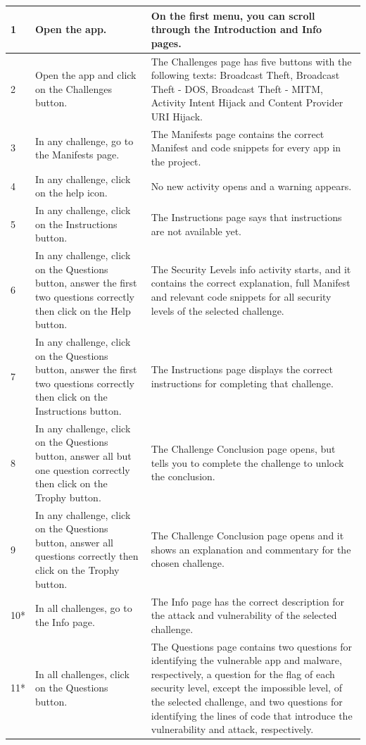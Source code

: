 \begin{center}
\begin{longtable}{|p{0.4cm} |p{5.2cm} |p{7.4cm} |}
         \hline
         1 & Open the app. & On the first menu, you can scroll through the Introduction and Info pages. \\
         \hline
         2 & Open the app and click on the Challenges button. & The Challenges page has five buttons with the following texts: Broadcast Theft, Broadcast Theft - DOS, Broadcast Theft - MITM, Activity Intent Hijack and Content Provider URI Hijack. \\
         \hline
         3 & In any challenge, go to the Manifests page. & The Manifests page contains the correct Manifest and code snippets for every app in the project. \\
         \hline
         4 & In any challenge, click on the help icon. & No new activity opens and a warning appears. \\
         \hline
         5 & In any challenge, click on the Instructions button. & The Instructions page says that instructions are not available yet.\\
         \hline
         6 & In any challenge, click on the Questions button, answer the first two questions correctly then click on the Help button. & The Security Levels info activity starts, and it contains the correct explanation, full Manifest and relevant code snippets for all security levels of the selected challenge.\\
         \hline
         7 & In any challenge, click on the Questions button, answer the first two questions correctly then click on the Instructions button. & The Instructions page displays the correct instructions for completing that challenge.\\
         \hline
         8 & In any challenge, click on the Questions button, answer all but one question correctly then click on the Trophy button. & The Challenge Conclusion page opens, but tells you to complete the challenge to unlock the conclusion.\\
         \hline
         9 & In any challenge, click on the Questions button, answer all questions correctly then click on the Trophy button. & The Challenge Conclusion page opens and it shows an explanation and commentary for the chosen challenge.\\
         \hline
         10* & In all challenges, go to the Info page. & The Info page has the correct description for the attack and vulnerability of the selected challenge. \\
         \hline
         11* & In all challenges, click on the Questions button. & The Questions page contains two questions for identifying the vulnerable app and malware, respectively, a question for the flag of each security level, except the impossible level, of the selected challenge, and two questions for identifying the lines of code that introduce the vulnerability and attack, respectively. \\

\end{longtable}
\end{center}
